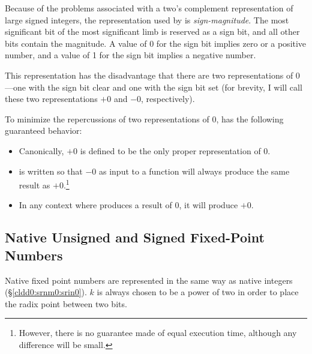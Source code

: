 Because of the problems associated with a two's complement 
representation of large signed integers, the representation 
used by \emph{\productbasenameshort{}} is 
\emph{sign-magnitude}.  The most 
significant bit of the most significant limb is reserved as 
a sign bit, and all other bits contain the magnitude.  A 
value of 0 for the sign bit implies zero or a positive 
number, and a value of 1 for the sign bit implies a negative 
number.  

This representation has the disadvantage that there are two 
representations of 0---one with the sign bit clear and one 
with the sign bit set (for brevity, I will call these two 
representations $+0$ and $-0$, respectively).  

To minimize the repercussions of two representations of 0, 
\emph{\productbasenameshort{}} has the following guaranteed 
behavior: 

\begin{itemize}
\item Canonically, $+0$ is defined to be the only proper
      representation of 0.
\item \emph{\productbasenameshort{}} is written so that
      $-0$ as input to a
      function will always
      produce the same result as $+0$.\footnote{However,
      there
      is no guarantee made of equal execution time,
      although any difference
      will be small.}
\item In any context where \emph{\productbasenameshort{}}
      produces a result
      of 0, it will produce $+0$.
\end{itemize}


\subsection{Native Unsigned and Signed Fixed-Point Numbers}
\label{cldd0:srnm0:snfp0}

Native fixed point numbers are represented in the same way as native
integers (\S{}\ref{cldd0:srnm0:srin0}).  $k$ is always chosen to be a
power of two in order to place the radix point between two bits.


